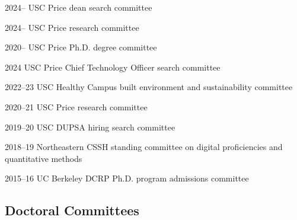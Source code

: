 \documentclass[11pt,letterpaper]{report}
\begin{document}
    \begin{tablist}
        \item[2024--]   \tab{}USC Price dean search committee
        \item[2024--]   \tab{}USC Price research committee
        \item[2020--]   \tab{}USC Price Ph.D. degree committee
        \item[2024]     \tab{}USC Price Chief Technology Officer search committee
        \item[2022--23] \tab{}USC Healthy Campus built environment and sustainability committee
        \item[2020--21] \tab{}USC Price research committee
        \item[2019--20] \tab{}USC DUPSA hiring search committee
        \item[2018--19] \tab{}Northeastern CSSH standing committee on digital proficiencies and quantitative methods
        \item[2015--16] \tab{}UC Berkeley DCRP Ph.D. program admissions committee

    \end{tablist}

    \subsection*{Doctoral Committees}
\end{document}
